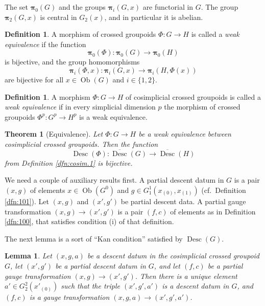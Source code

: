 \documentclass[a4paper,10pt]{amsart}
\newtheorem{thm}[equation]{Theorem}
\newtheorem{lem}[equation]{Lemma}
\theoremstyle{definition}
\newtheorem{dfn}[equation]{Definition}
\numberwithin{equation}{section}
\newcommand{\opn}{\operatorname}
\newcommand{\ol}{\overline}
\newcommand{\tup}[1]{\textup{#1}}
\newcommand{\bsym}[1]{\boldsymbol{#1}}
\begin{document}
The set $\bsym{\bsym{\pi}}_0(G)$ and the groups $\bsym{\bsym{\pi}}_i(G, x)$ are
functorial in $G$. 
The group $\bsym{\bsym{\pi}}_2(G, x)$ is central in $G_2(x)$, 
and in particular it is abelian.

\begin{dfn} \label{dfn:equiv-cosim.102}
A morphism of crossed groupoids $\Phi : G \to H$  
is called a {\em weak equivalence} if the function
\[ \bsym{\bsym{\pi}}_0(\Phi)  : \bsym{\bsym{\pi}}_0(G) \to
\bsym{\bsym{\pi}}_0(H)  \]
is bijective, and the group homomorphisms
\[ \bsym{\bsym{\pi}}_i(\Phi, x) : \bsym{\bsym{\pi}}_i(G, x) \to
\bsym{\bsym{\pi}}_i(H, \Phi(x))  \]
are bijective for all $x \in \opn{Ob}(G)$
and $i \in \{ 1, 2 \}$.
\end{dfn}

\begin{dfn} \label{dfn:equiv-cosim.103}
A morphism $\Phi : G \to H$
of cosimplicial crossed groupoids is called a {\em weak equivalence} if in
every simplicial dimension $p$ the morphism of crossed groupoids
 $\Phi^p : G^p \to H^p$ is a weak equivalence.
\end{dfn}

\begin{thm}[Equivalence] \label{thm:100} 
Let $\Phi : G \to H$ be a weak equivalence between 
cosimplicial crossed groupoids. Then the function 
\[ \ol{\opn{Desc}}(\Phi) : \ol{\opn{Desc}}(G) \to
\ol{\opn{Desc}}(H) \]
from Definition \tup{\ref{dfn:cosim.1}} is bijective.
\end{thm}

We need a couple of auxiliary results first. 
A partial descent datum in $G$ is a pair $(x, g)$ of elements
$x \in \opn{Ob}(G^0)$ and 
$g \in G^1_1(x_{(0)}, x_{(1)})$ (cf.\ Definition \ref{dfn:101}).
Let $(x, g)$ and $(x', g')$ be partial descent data. A partial gauge
transformation $(x, g) \to (x', g')$ is a pair $(f, c)$ of elements 
as in Definition \tup{\ref{dfn:100}}, that satisfies condition \tup{(i)} of that
definition.

The next lemma is a sort of ``Kan condition'' satisfied by 
$\opn{Desc}(G)$.

\begin{lem} \label{lem:104}
Let $(x, g, a)$ be a descent datum in the cosimplicial crossed groupoid
$G$, let $(x', g')$ be a partial
descent datum in $G$, and let $(f, c)$ be a partial gauge
transformation $(x, g) \to (x', g')$.  Then there is a unique element 
$a' \in G^2_2(x'_{(0)})$ such that the triple 
$(x', g', a')$ is a descent datum in $G$, and 
$(f, c)$ is a gauge transformation
$(x, g, a) \to (x', g', a')$.
\end{lem}
\end{document}
